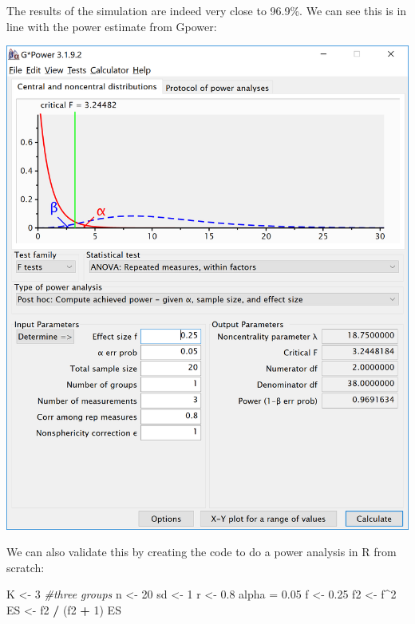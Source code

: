 \documentclass[]{book}
\newenvironment{Shaded}{\begin{snugshade}}{\end{snugshade}}
\newcommand{\CommentTok}[1]{\textcolor[rgb]{0.56,0.35,0.01}{\textit{#1}}}
\newcommand{\DecValTok}[1]{\textcolor[rgb]{0.00,0.00,0.81}{#1}}
\newcommand{\FloatTok}[1]{\textcolor[rgb]{0.00,0.00,0.81}{#1}}
\newcommand{\NormalTok}[1]{#1}
\newcommand{\OperatorTok}[1]{\textcolor[rgb]{0.81,0.36,0.00}{\textbf{#1}}}
\newcommand{\StringTok}[1]{\textcolor[rgb]{0.31,0.60,0.02}{#1}}
\begin{document}
The results of the simulation are indeed very close to 96.9\%. We can see this is in line with the power estimate from Gpower:

\includegraphics{screenshots/gpower_12.png}

We can also validate this by creating the code to do a power analysis in R from scratch:

\begin{Shaded}
\begin{Highlighting}[]
\NormalTok{K <-}\StringTok{ }\DecValTok{3} \CommentTok{#three groups}
\NormalTok{n <-}\StringTok{ }\DecValTok{20}
\NormalTok{sd <-}\StringTok{ }\DecValTok{1}
\NormalTok{r <-}\StringTok{ }\FloatTok{0.8}
\NormalTok{alpha =}\StringTok{ }\FloatTok{0.05}
\NormalTok{f <-}\StringTok{ }\FloatTok{0.25}
\NormalTok{f2 <-}\StringTok{ }\NormalTok{f}\OperatorTok{^}\DecValTok{2}
\NormalTok{ES <-}\StringTok{ }\NormalTok{f2 }\OperatorTok{/}\StringTok{ }\NormalTok{(f2 }\OperatorTok{+}\StringTok{ }\DecValTok{1}\NormalTok{)}
\NormalTok{ES}
\end{Highlighting}
\end{Shaded}
\end{document}
